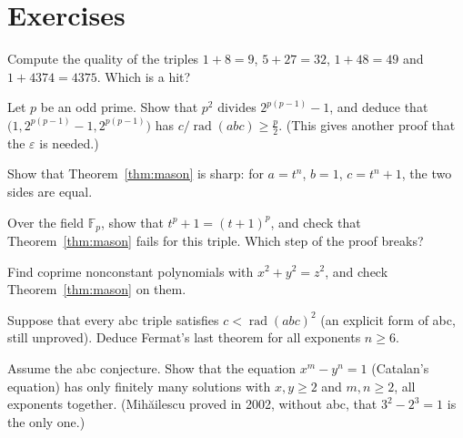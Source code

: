 \section{Exercises}

\begin{exercise}[$\star$]\label{ex:quality}
Compute the quality of the triples $1+8=9$, $5+27=32$, $1+48=49$ and $1+4374=4375$. Which is a hit?
\end{exercise}

\begin{exercise}[$\star\star$]\label{ex:fermatsquare}
Let $p$ be an odd prime. Show that $p^2$ divides $2^{p(p-1)}-1$, and deduce that $\bigl(1,2^{p(p-1)}-1,2^{p(p-1)}\bigr)$ has
$c/\operatorname{rad}(abc)\ge\frac p2$. (This gives another proof that the $\varepsilon$ is needed.)
\end{exercise}

\begin{exercise}[$\star$]\label{ex:masonsharp}
Show that Theorem~\ref{thm:mason} is sharp: for $a=t^n$, $b=1$, $c=t^n+1$, the two sides are equal.
\end{exercise}

\begin{exercise}[$\star$]\label{ex:charp}
Over the field $\mathbb F_p$, show that $t^p+1=(t+1)^p$, and check that Theorem~\ref{thm:mason} fails for this triple. Which step of the proof breaks?
\end{exercise}

\begin{exercise}[$\star$]\label{ex:pythpoly}
Find coprime nonconstant polynomials with $x^2+y^2=z^2$, and check Theorem~\ref{thm:mason} on them.
\end{exercise}

\begin{exercise}[$\star\star$]\label{ex:explicitabc}
Suppose that every abc triple satisfies $c<\operatorname{rad}(abc)^2$ (an explicit form of abc, still unproved). Deduce Fermat's last theorem for all
exponents $n\ge6$.
\end{exercise}

\begin{exercise}[$\star\star$]\label{ex:catalan}
Assume the abc conjecture. Show that the equation $x^m-y^n=1$ (Catalan's equation) has only finitely many solutions with $x,y\ge2$ and $m,n\ge2$, all
exponents together. (Mih\u ailescu proved in 2002, without abc, that $3^2-2^3=1$ is the only one.)
\end{exercise}

